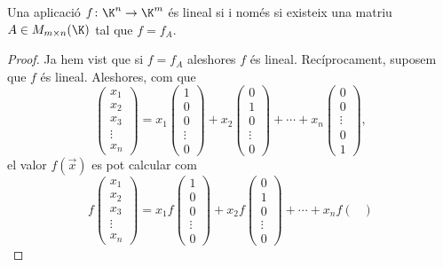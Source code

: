 \begin{proposicio}\label{prop:apl_lin_Kn}
	Una aplicació $f\colon \K^n\to \K^m$ és lineal si i només si existeix una matriu $A\in M_{m\times n}(\K)$ tal que $f=f_A$.
\end{proposicio}
\begin{proof}
	Ja hem vist que si $f=f_A$ aleshores $f$ és lineal. Recíprocament, suposem que $f$ és lineal. Aleshores, com que
	\[
	\begin{pmatrix}
	x_1\\x_2\\x_3\\\vdots\\x_n
	\end{pmatrix}
	=x_1\begin{pmatrix}
	1\\0\\0\\\vdots\\0
	\end{pmatrix}
	+
	x_2\begin{pmatrix}
	0\\1\\0\\\vdots\\0
	\end{pmatrix}
	+\cdots+
	x_n
	\begin{pmatrix}
	0\\0\\\vdots\\0\\1
	\end{pmatrix},
	\]
	el valor $f(\vec x)$ es pot calcular com
	\[
	f\begin{pmatrix}
	x_1\\x_2\\x_3\\\vdots\\x_n
	\end{pmatrix}
	=x_1f\begin{pmatrix}
	1\\0\\0\\\vdots\\0
	\end{pmatrix}
	+
	x_2f\begin{pmatrix}
	0\\1\\0\\\vdots\\0
	\end{pmatrix}
	+\cdots+
	x_n
	f\begin{pmatrix}

\end{pmatrix}\]
\end{proof}

